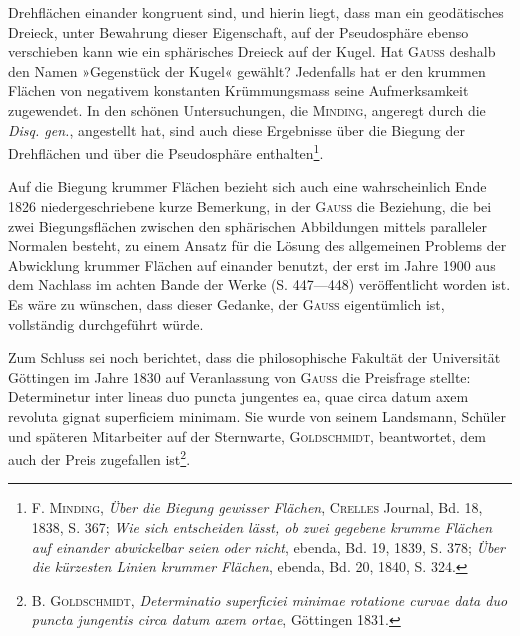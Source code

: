 Drehflächen einander kongruent sind, und hierin liegt, dass man ein geodätisches
Dreieck, unter Bewahrung dieser Eigenschaft, auf der Pseudosphäre
ebenso verschieben kann wie ein sphärisches Dreieck auf der Kugel. Hat
\textsc{Gauss} deshalb den Namen »Gegenstück der Kugel« gewählt? Jedenfalls hat
er den krummen Flächen von negativem konstanten Krümmungsmass seine
Aufmerksamkeit zugewendet. In den schönen Untersuchungen, die \textsc{Minding},
angeregt durch die \textit{Disq. gen.}, angestellt hat, sind auch diese Ergebnisse über
die Biegung der Drehflächen und über die Pseudosphäre enthalten\footnote{\textsc{F. Minding}, \textit{Über die Biegung gewisser Flächen}, \textsc{Crelles} Journal, Bd. 18, 1838, S. 367; \textit{Wie sich entscheiden lässt, ob zwei gegebene krumme Flächen auf einander abwickelbar seien oder nicht}, ebenda, Bd. 19, 1839, S. 378; \textit{Über die kürzesten Linien krummer Flächen}, ebenda, Bd. 20, 1840, S. 324.}.
\par
Auf die Biegung krummer Flächen bezieht sich auch eine wahrscheinlich
Ende 1826 niedergeschriebene kurze Bemerkung, in der \textsc{Gauss} die Beziehung,
die bei zwei Biegungsflächen zwischen den sphärischen Abbildungen mittels
paralleler Normalen besteht, zu einem Ansatz für die Lösung des allgemeinen
Problems der Abwicklung krummer Flächen auf einander benutzt, der erst
im Jahre 1900 aus dem Nachlass im achten Bande der Werke (S. 447—448)
\clearpage{}\setcounter{footnote}{0}
\noindent veröffentlicht worden ist. Es wäre zu wünschen, dass dieser Gedanke, der
\textsc{Gauss} eigentümlich ist, vollständig durchgeführt würde.
\par
Zum Schluss sei noch berichtet, dass die philosophische Fakultät der
Universität Göttingen im Jahre 1830 auf Veranlassung von \textsc{Gauss} die Preisfrage
stellte: Determinetur inter lineas duo puncta jungentes ea, quae circa
datum axem revoluta gignat superficiem minimam. Sie wurde von seinem
Landsmann, Schüler und späteren Mitarbeiter auf der Sternwarte, \textsc{Goldschmidt},
beantwortet, dem auch der Preis zugefallen ist\footnote{\textsc{B. Goldschmidt}, \textit{Determinatio superficiei minimae rotatione curvae data duo puncta jungentis circa datum axem ortae}, Göttingen 1831.}.
\clearpage\endgroup
